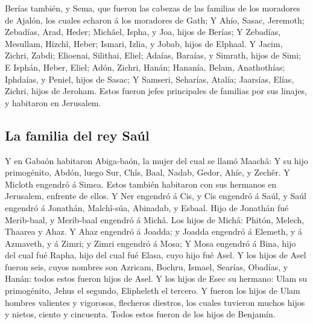  Berías también, y Sema, que fueron las cabezas de las
familias de los moradores de Ajalón, los cuales echaron á los moradores
de Gath;  Y Ahío, Sasac, Jeremoth; 
Zebadías, Arad, Heder;  Michâel, Ispha, y Joa, hijos de
Berías;  Y Zebadías, Mesullam, Hizchî, Heber;
 Ismari, Izlia, y Jobab, hijos de Elphaal.
 Y Jacim, Zichri, Zabdi;  Elioenai,
Silithai, Eliel;  Adaías, Baraías, y Simrath, hijos de
Simi;  E Isphán, Heber, Eliel;  Adón,
Zichri, Hanán;  Hananía, Belam, Anathothías;
 Iphdaías, y Peniel, hijos de Sasac;  Y
Samseri, Seharías, Atalía;  Jaarsías, Elías, Zichri,
hijos de Jeroham.  Estos fueron jefes principales de
familias por sus linajes, y habitaron en Jerusalem.

\hypertarget{la-familia-del-rey-sauxfal}{%
\subsection{La familia del rey Saúl}\label{la-familia-del-rey-sauxfal}}

 Y en Gabaón habitaron Abiga-baón, la mujer del cual se
llamó Maachâ:  Y su hijo primogénito, Abdón, luego Sur,
Chîs, Baal, Nadab,  Gedor, Ahíe, y Zechêr.
 Y Micloth engendró á Simea. Estos también habitaron con
sus hermanos en Jerusalem, enfrente de ellos.  Y Ner
engendró á Cis, y Cis engendró á Saúl, y Saúl engendró á Jonathán,
Malchî-súa, Abinadab, y Esbaal.  Hijo de Jonathán fué
Merib-baal, y Merib-baal engendró á Michâ.  Los hijos de
Michâ: Phitón, Melech, Thaarea y Ahaz.  Y Ahaz engendró á
Joadda; y Joadda engendró á Elemeth, y á Azmaveth, y á Zimri; y Zimri
engendró á Mosa;  Y Mosa engendró á Bina, hijo del cual
fué Rapha, hijo del cual fué Elasa, cuyo hijo fué Asel. 
Y los hijos de Asel fueron seis, cuyos nombres son Azricam, Bochru,
Ismael, Searías, Obadías, y Hanán: todos estos fueron hijos de Asel.
 Y los hijos de Esec su hermano: Ulam su primogénito,
Jehus el segundo, Elipheleth el tercero.  Y fueron los
hijos de Ulam hombres valientes y vigorosos, flecheros diestros, los
cuales tuvieron muchos hijos y nietos, ciento y cincuenta. Todos estos
fueron de los hijos de Benjamín.

